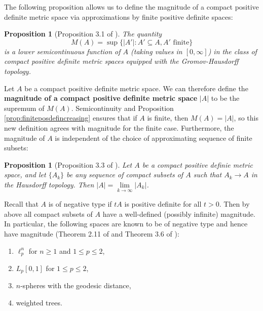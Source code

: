 \documentclass[11pt]{article}
\theoremstyle{mythm}
\newtheorem{prop}[defn]{Proposition}
\begin{document}
The following proposition allows us to define the magnitude of a compact positive definite metric space via approximations by finite positive definite spaces:

\begin{prop}[Proposition 3.1 of \cite{leinster_magnitude_2017}]\label{prop:MAlsc}
The quantity
\begin{equation*}
M(A) = \sup\{\vert A'\vert : A' \subseteq A, \text{$A'$ finite}\}
\end{equation*}
is a lower semicontinuous function of $A$ (taking values in $[0,\infty]$) in the class of compact positive definite metric spaces equipped with the Gromov-Hausdorff topology.
\end{prop}

Let $A$ be a compact positive definite metric space. We can therefore define the \textbf{magnitude of a compact positive definite metric space} $\vert A \vert$ to be the supremum of $M(A)$. Semicontinuity and Proposition \ref{prop:finiteposdefincreasing} ensures that if $A$ is finite, then $M(A) = \vert A \vert$, so this new definition agrees with magnitude for the finite case. Furthermore, the magnitude of $A$ is independent of the choice of approximating sequence of finite subsets:

\begin{prop}[Proposition 3.3 of \cite{leinster_magnitude_2017}]\label{prop:finiteapprox}
Let $A$ be a compact positive definie metric space, and let $\{A_k\}$ be any sequence of compact subsets of $A$ such that $A_k\to A$ in the Hausdorff topology. Then $\vert A \vert = \lim\limits_{k\to\infty}\vert A_k\vert$.
\end{prop}

Recall that $A$ is of negative type if $tA$ is positive definite for all $t > 0$. Then by above all compact subsets of $A$ have a well-defined (possibly infinite) magnitude. In particular, the following spaces are known to be of negative type and hence have magnitude (Theorem 2.11 of \cite{leinster_magnitude_2017} and Theorem 3.6 of \cite{meckes_positive_2013}):

\begin{enumerate}[label=\arabic*.]
\item $\ell^n_p$ for $n\geq1$ and $1\leq p \leq 2$,
\item $L_p[0,1]$ for $1\leq p \leq 2$,
\item $n$-spheres with the geodesic distance,
\item weighted trees.
\end{enumerate}
\end{document}
